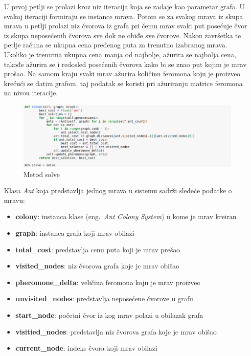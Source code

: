 \documentclass[a4paper]{article}
\begin{document}
{U prvoj petlji se prolazi kroz niz iteracija koja se zadaje kao parametar grafa. U svakoj iteraciji formiraju se instance mrava. Potom se za svakog mrava iz skupa mrava u petlji prolazi niz čvorova iz grafa pri čemu mrav svaki put posećuje čvor iz skupa neposećenih čvorova sve dok ne obiđe sve čvorove. Nakon završetka te petlje računa se ukupna cena pređenog puta za trenutno izabranog mrava. Ukoliko je trenutna ukupna cena manja od najbolje, ažurira se najbolja cena, takođe ažurira se i redosled posećenih čvorova kako bi se znao put kojim je mrav prošao. Na samom kraju svaki mrav ažurira količinu feromona koju je proizveo krećući se datim grafom, taj podatak se koristi pri ažuriranju matrice feromona na nivou iteracije. 

\begin{figure}[h!]
\begin{center}
\includegraphics[width=1\columnwidth]{slika4.png}
\end{center}
\caption{Metod solve}
\label{fig:slika4}
\end{figure}

Klasa \textit{Ant} koja predstavlja jednog mrava u sistemu sadrži sledeće podatke o mravu:

\begin{itemize}
\item \textbf{colony}: instanca klase (eng.~{\em Ant Colony System}) u kome je mrav kreiran
\item \textbf{graph}: instanca grafa koji mrav obilazi
\item \textbf{total\_cost}: predstavlja cenu puta koji je mrav prešao
\item \textbf{visited\_nodes}: niz čvorova grafa koje je mrav obišao
\item \textbf{pheromone\_delta}: veličina feromona koju je mrav proizveo
\item \textbf{unvisited\_nodes}: predstavlja neposećene čvorove u grafu
\item \textbf{start\_node}: početni čvor iz kog mrav polazi u obilazak grafa
\item \textbf{visitied\_nodes}: predstavlja niz čvorova grafa koje je mrav obišao
\item \textbf{current\_node}: indeks čvora koji mrav obilazi


\end{itemize}}
\end{document}
